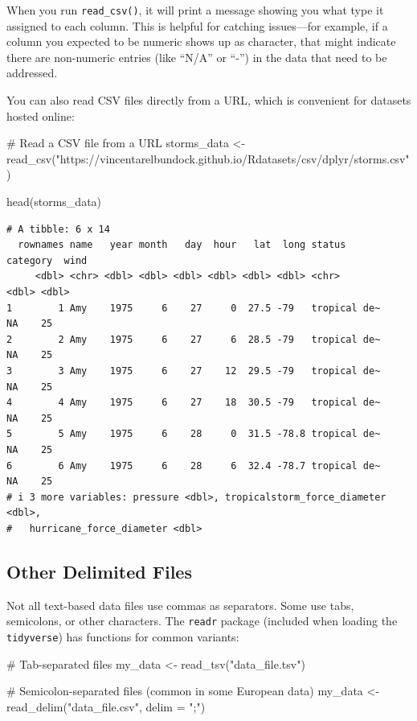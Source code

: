 \documentclass[
  letterpaper,
  DIV=11,
  numbers=noendperiod]{scrreprt}
\newenvironment{Shaded}{\begin{snugshade}}{\end{snugshade}}
\newcommand{\AttributeTok}[1]{\textcolor[rgb]{0.40,0.45,0.13}{#1}}
\newcommand{\CommentTok}[1]{\textcolor[rgb]{0.37,0.37,0.37}{#1}}
\newcommand{\FunctionTok}[1]{\textcolor[rgb]{0.28,0.35,0.67}{#1}}
\newcommand{\NormalTok}[1]{\textcolor[rgb]{0.00,0.23,0.31}{#1}}
\newcommand{\OtherTok}[1]{\textcolor[rgb]{0.00,0.23,0.31}{#1}}
\newcommand{\StringTok}[1]{\textcolor[rgb]{0.13,0.47,0.30}{#1}}
\begin{document}
When you run \texttt{read\_csv()}, it will print a message showing you
what type it assigned to each column. This is helpful for catching
issues---for example, if a column you expected to be numeric shows up as
character, that might indicate there are non-numeric entries (like
``N/A'' or ``-'') in the data that need to be addressed.

You can also read CSV files directly from a URL, which is convenient for
datasets hosted online:

\begin{Shaded}
\begin{Highlighting}[]
\CommentTok{\# Read a CSV file from a URL}
\NormalTok{storms\_data }\OtherTok{\textless{}{-}} \FunctionTok{read\_csv}\NormalTok{(}\StringTok{"https://vincentarelbundock.github.io/Rdatasets/csv/dplyr/storms.csv"}\NormalTok{)}

\FunctionTok{head}\NormalTok{(storms\_data)}
\end{Highlighting}
\end{Shaded}

\begin{verbatim}
# A tibble: 6 x 14
  rownames name   year month   day  hour   lat  long status       category  wind
     <dbl> <chr> <dbl> <dbl> <dbl> <dbl> <dbl> <dbl> <chr>           <dbl> <dbl>
1        1 Amy    1975     6    27     0  27.5 -79   tropical de~       NA    25
2        2 Amy    1975     6    27     6  28.5 -79   tropical de~       NA    25
3        3 Amy    1975     6    27    12  29.5 -79   tropical de~       NA    25
4        4 Amy    1975     6    27    18  30.5 -79   tropical de~       NA    25
5        5 Amy    1975     6    28     0  31.5 -78.8 tropical de~       NA    25
6        6 Amy    1975     6    28     6  32.4 -78.7 tropical de~       NA    25
# i 3 more variables: pressure <dbl>, tropicalstorm_force_diameter <dbl>,
#   hurricane_force_diameter <dbl>
\end{verbatim}

\subsection{Other Delimited Files}\label{other-delimited-files}

Not all text-based data files use commas as separators. Some use tabs,
semicolons, or other characters. The \texttt{readr} package (included
when loading the \texttt{tidyverse}) has functions for common variants:

\begin{Shaded}
\begin{Highlighting}[]
\CommentTok{\# Tab{-}separated files}
\NormalTok{my\_data }\OtherTok{\textless{}{-}} \FunctionTok{read\_tsv}\NormalTok{(}\StringTok{"data\_file.tsv"}\NormalTok{)}

\CommentTok{\# Semicolon{-}separated files (common in some European data)}
\NormalTok{my\_data }\OtherTok{\textless{}{-}} \FunctionTok{read\_delim}\NormalTok{(}\StringTok{"data\_file.csv"}\NormalTok{, }\AttributeTok{delim =} \StringTok{";"}\NormalTok{)}
\end{Highlighting}
\end{Shaded}
\end{document}
